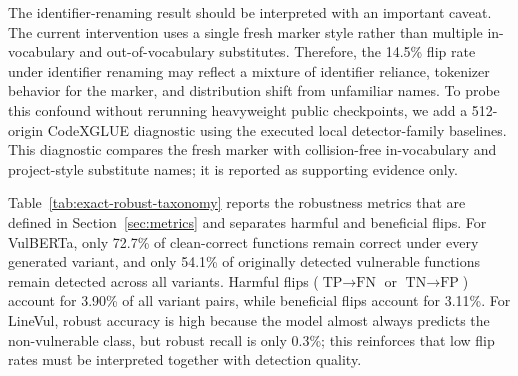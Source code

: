 \documentclass[a4paper,fleqn]{cas-dc}
\begin{document}
The identifier-renaming result should be interpreted with an important caveat.
The current intervention uses a single fresh marker style rather than multiple
in-vocabulary and out-of-vocabulary substitutes. Therefore, the 14.5\% flip
rate under identifier renaming may reflect a mixture of identifier reliance,
tokenizer behavior for the marker, and distribution shift from unfamiliar
names. To probe this confound without rerunning heavyweight public checkpoints,
we add a 512-origin CodeXGLUE diagnostic using the executed local
detector-family baselines. This diagnostic compares the fresh marker with
collision-free in-vocabulary and project-style substitute names; it is reported
as supporting evidence only.

Table~\ref{tab:exact-robust-taxonomy} reports the robustness metrics that are
defined in Section~\ref{sec:metrics} and separates harmful and beneficial
flips. For VulBERTa, only 72.7\% of clean-correct functions remain correct
under every generated variant, and only 54.1\% of originally detected
vulnerable functions remain detected across all variants. Harmful flips
($\text{TP}\rightarrow\text{FN}$ or $\text{TN}\rightarrow\text{FP}$) account for
3.90\% of all variant pairs, while beneficial flips account for 3.11\%. For
LineVul, robust accuracy is high because the model almost always predicts the
non-vulnerable class, but robust recall is only 0.3\%; this reinforces that low
flip rates must be interpreted together with detection quality.

\begin{table}[t]
  \centering
  \caption{Robustness and flip taxonomy for the full exact public CodeXGLUE VulBERTa and LineVul runs. GraphCodeBERT is omitted because it is executed only on the 512-origin subset, and ReGVD is omitted because its validation-calibrated operating point is near-all-positive and not directly comparable for clean true-positive robustness. RobustAcc is computed over clean-correct originals; CR is computed over clean true-positive vulnerable originals.}
  \label{tab:exact-robust-taxonomy}
\end{table}
\end{document}
